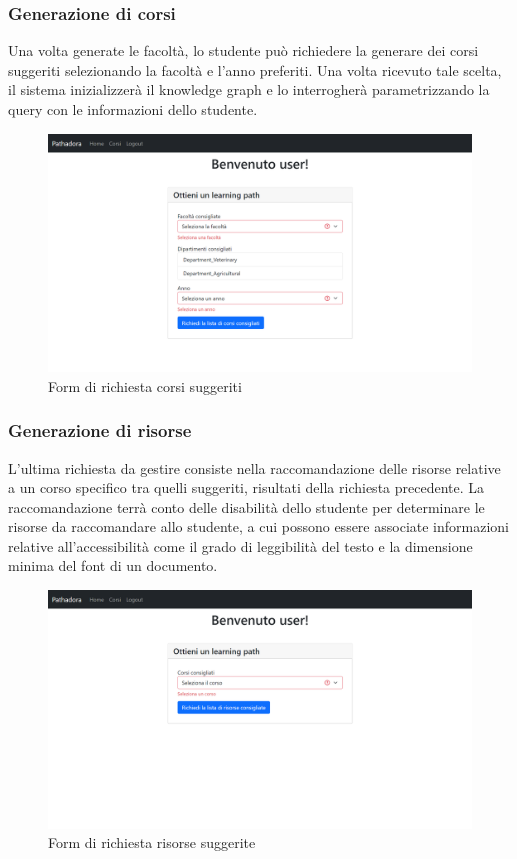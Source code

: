 \subsubsection{Generazione di corsi}
Una volta generate le facoltà, lo studente può richiedere la generare dei corsi suggeriti selezionando la facoltà e l'anno preferiti. 
Una volta ricevuto tale scelta, il sistema inizializzerà il knowledge graph e lo interrogherà parametrizzando la query con le informazioni dello studente.

\begin{figure}[H]
\centering
\includegraphics[scale=0.4]{res/courses-generation.png}
\caption{Form di richiesta corsi suggeriti}
\label{fig:courses-generation}
\end{figure}

\subsubsection{Generazione di risorse}
L'ultima richiesta da gestire consiste nella raccomandazione delle risorse relative a un corso specifico tra quelli suggeriti, risultati della richiesta precedente.
La raccomandazione terrà conto delle disabilità dello studente per determinare le risorse da raccomandare allo studente, a cui possono essere associate informazioni relative all'accessibilità come il grado di leggibilità del testo e la dimensione minima del font di un documento.

\begin{figure}[H]
\centering
\includegraphics[scale=0.4]{res/resources-generation.png}
\caption{Form di richiesta risorse suggerite}
\label{fig:resources-generation}
\end{figure}

